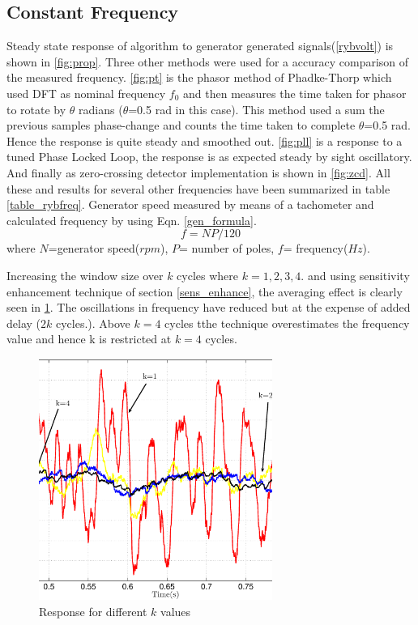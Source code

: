 \subsection{Constant Frequency}
Steady state response of algorithm to generator generated signals(\figurename \ref{rybvolt}) is shown in \figurename \ref{fig:prop}. Three other methods were used for a accuracy comparison of the measured frequency. \figurename\ref{fig:pt} is the phasor method of Phadke-Thorp \cite{phadkethorp} which used DFT as nominal frequency $f_{0}$ and then measures the time taken for phasor to rotate by $\theta$ radians ($\theta$=0.5 rad in this case). This method used a sum the previous samples phase-change and counts the time taken to complete $\theta$=0.5 rad. Hence the response is quite steady and smoothed out. \figurename \ref{fig:pll} is a response to a tuned Phase Locked Loop, the response is as expected steady by sight oscillatory. And finally as zero-crossing detector implementation is shown in \figurename \ref{fig:zcd}. All these and results for several other frequencies have been summarized in table \ref{table_rybfreq}. Generator speed measured by means of a tachometer and calculated frequency by using Eqn. \ref{gen_formula}.
\begin{equation}
f=NP/120
 \label{gen_formula}
\end{equation}
where $N$=generator speed($rpm$), $P$= number of poles, $f$= frequency($Hz$).

Increasing the window size over $k$ cycles where $k = 1,2,3,4.$ and using sensitivity enhancement technique of section \ref{sens_enhance}, the averaging effect is clearly seen in \figurename\ref{diffkvalues}. The oscillations in frequency have reduced but at the expense of added delay ($2k$ cycles.). Above $k=4$ cycles tthe technique overestimates the frequency value and hence k is restricted at $k=4$ cycles.
\begin{figure}[!t]
\centering
\includegraphics[width=3.0in]{diffkvalues}
\caption{Response for different $k$ values}
\label{diffkvalues}
\end{figure}


